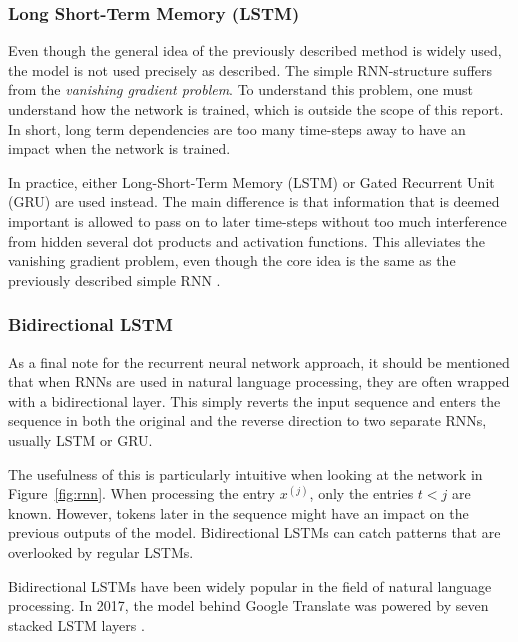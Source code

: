 \subsubsection{Long Short-Term Memory (LSTM)}

Even though the general idea of the previously described method is widely used, the model is not used precisely as described. The simple RNN-structure suffers from the \textit{vanishing gradient problem}. To understand this problem, one must understand how the network is trained, which is outside the scope of this report. In short, long term dependencies are too many time-steps away to have an impact when the network is trained. 

In practice, either Long-Short-Term Memory (LSTM) or Gated Recurrent Unit (GRU) are used instead. The main difference is that information that is deemed important is allowed to pass on to later time-steps without too much interference from hidden several dot products and activation functions. This alleviates the vanishing gradient problem, even though the core idea is the same as the previously described simple RNN \citep{chollet2017deep}.

\subsubsection{Bidirectional LSTM}
As a final note for the recurrent neural network approach, it should be mentioned that when RNNs are used in natural language processing, they are often wrapped with a bidirectional layer. This simply reverts the input sequence and enters the sequence in both the original and the reverse direction to two separate RNNs, usually LSTM or GRU. 

The usefulness of this is particularly intuitive when looking at the network in Figure~\ref{fig:rnn}. When processing the entry $x^{(j)}$, only the entries $t < j$ are known. However, tokens later in the sequence might have an impact on the previous outputs of the model. Bidirectional LSTMs can catch patterns that are overlooked by regular LSTMs.

Bidirectional LSTMs have been widely popular in the field of natural language processing. In 2017, the model behind Google Translate was powered by seven stacked LSTM layers \citep{chollet2017deep}. 

